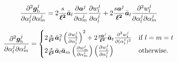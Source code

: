 \begin{equation}
    \frac{\partial^2\bm{g}_\text{b}^j}{\partial\alpha^j_l\partial\alpha^j_m} =  2\frac{s}{\bm{\ell^2}}\bar{\bm{a}}_l \frac{\partial\bm{a}^j}{\partial\alpha^j_m} \frac{\partial w_l^j}{\partial\alpha^j_l} + 2\frac{s\bm{a}^j}{\bm{\ell^2}}\bar{\bm{a}}_l \frac{\partial^2w_l^j}{\partial\alpha^j_l\partial\alpha^j_m}
\end{equation}

\begin{equation}
    \frac{\partial^2\bm{g}_\text{b}^j}{\partial\alpha^j_l\partial\alpha^j_m} = 
    \begin{cases}
        2\frac{s}{\bm{\ell^2}}\bar{\bm{a}}_t^2\left(\frac{\partial w_t^j}{\partial\alpha_t^j}\right)^2  + 2\frac{s\bm{a}^j}{\bm{\ell^2}}\bar{\bm{a}}_t \frac{\partial^2w_t^j}{\partial(\alpha^j_t)^2} & \text{if }l=m=t\\
        2\frac{s}{\bm{\ell^2}}\bar{\bm{a}}_l\bar{\bm{a}}_m\left(\frac{\partial w_m^j}{\partial\alpha_m^j}\right) \left(\frac{\partial w_l^j}{\partial\alpha_l^j}\right)
         & \text{otherwise.}
    \end{cases}
\end{equation}